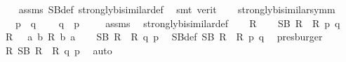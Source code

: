 \begin{isabellebody}
%
\isadelimproof
\ \ %
\endisadelimproof
%
\isatagproof
{}\isamarkupfalse%
\ assms\ SB{\isacharunderscore}{\kern0pt}def\ strongly{\isacharunderscore}{\kern0pt}bisimilar{\isacharunderscore}{\kern0pt}def\ \isamarkupfalse%
\ {\isacharparenleft}{\kern0pt}smt\ {\isacharparenleft}{\kern0pt}verit{\isacharparenright}{\kern0pt}{\isacharparenright}{\kern0pt}{\isacharplus}{\kern0pt}%
\endisatagproof
{\isafoldproof}%
%
\isadelimproof
\isanewline
%
\endisadelimproof
\ \ \isanewline
{}\isamarkupfalse%
\ strongly{\isacharunderscore}{\kern0pt}bisimilar{\isacharunderscore}{\kern0pt}symm{\isacharcolon}{\kern0pt}\isanewline
\ \ \ {\isacartoucheopen}p\ {\isasymleftrightarrow}\ q{\isacartoucheclose}\ \isanewline
\ \ \ {\isacartoucheopen}q\ {\isasymleftrightarrow}\ p{\isacartoucheclose}\ \isanewline
%
\isadelimproof
\ \ %
\endisadelimproof
%
\isatagproof
{}\isamarkupfalse%
\ assms\ \isamarkupfalse%
\ strongly{\isacharunderscore}{\kern0pt}bisimilar{\isacharunderscore}{\kern0pt}def\isanewline
{}\isamarkupfalse%
\isanewline
\ \ \isamarkupfalse%
\ R\isanewline
\ \ \isamarkupfalse%
\ {\isacartoucheopen}SB\ R\ {\isasymand}\ R\ p\ q{\isacartoucheclose}\isanewline
\ \ \isamarkupfalse%
\ {\isacharquery}{\kern0pt}R{\isacharprime}{\kern0pt}\ {\isacharequal}{\kern0pt}\ {\isacartoucheopen}{\isasymlambda}\ a\ b{\isachardot}{\kern0pt}\ R\ b\ a{\isacartoucheclose}\isanewline
\ \ \isamarkupfalse%
\ {\isacartoucheopen}SB\ {\isacharquery}{\kern0pt}R{\isacharprime}{\kern0pt}\ {\isasymand}\ {\isacharquery}{\kern0pt}R{\isacharprime}{\kern0pt}\ q\ p{\isacartoucheclose}\ \isamarkupfalse%
\ SB{\isacharunderscore}{\kern0pt}def\ {\isacartoucheopen}SB\ R\ {\isasymand}\ R\ p\ q{\isacartoucheclose}\ \isamarkupfalse%
\ presburger\isanewline
\ \ \isamarkupfalse%
\ {\isacartoucheopen}{\isasymexists}R{\isachardot}{\kern0pt}\ SB\ R\ {\isasymand}\ R\ q\ p{\isacartoucheclose}\ \isamarkupfalse%
\ auto\isanewline
{}\isamarkupfalse%
%
\endisatagproof
{\isafoldproof}%
%
\isadelimproof
\isanewline
%
\endisadelimproof
\isanewline
{}\isamarkupfalse%
\ %
%
\isadelimtheory
%
\endisadelimtheory
%
\isatagtheory
%
\endisatagtheory
{\isafoldtheory}%
%
\isadelimtheory
%
\endisadelimtheory
%
\end{isabellebody}%
\endinput
